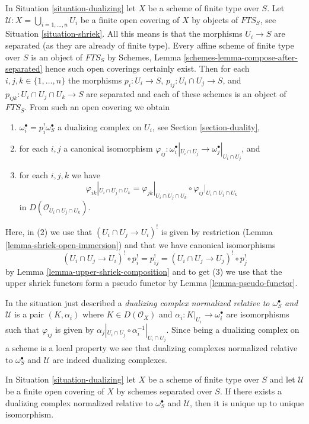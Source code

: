 \noindent
In Situation \ref{situation-dualizing} let $X$ be a scheme of finite type
over $S$. Let $\mathcal{U} : X = \bigcup_{i = 1, \ldots, n} U_i$
be a finite open covering of $X$ by objects of $\textit{FTS}_S$, see
Situation \ref{situation-shriek}. All this means is that the morphisms
$U_i \to S$ are separated (as they are already of finite type).
Every affine scheme of finite type over $S$ is an object of $\textit{FTS}_S$
by Schemes, Lemma \ref{schemes-lemma-compose-after-separated}
hence such open coverings certainly exist.
Then for each $i, j, k \in \{1, \ldots, n\}$
the morphisms $p_i : U_i \to S$, $p_{ij} : U_i \cap U_j \to S$,
and $p_{ijk} : U_i \cap U_j \cap U_k \to S$ are separated and
each of these schemes is an object of $\textit{FTS}_S$.
From such an open covering we obtain
\begin{enumerate}
\item $\omega_i^\bullet = p_i^!\omega_S^\bullet$
a dualizing complex on $U_i$, see Section \ref{section-duality},
\item for each $i, j$ a canonical isomorphism
$\varphi_{ij} :
\omega_i^\bullet|_{U_i \cap U_j} \to \omega_j^\bullet|_{U_i \cap U_j}$, and
\item
\label{item-cocycle-glueing}
for each $i, j, k$ we have
$$
\varphi_{ik}|_{U_i \cap U_j \cap U_k} =
\varphi_{jk}|_{U_i \cap U_j \cap U_k} \circ
\varphi_{ij}|_{U_i \cap U_j \cap U_k}
$$
in $D(\mathcal{O}_{U_i \cap U_j \cap U_k})$.
\end{enumerate}
Here, in (2) we use that $(U_i \cap U_j \to U_i)^!$
is given by restriction (Lemma \ref{lemma-shriek-open-immersion})
and that we have canonical isomorphisms
$$
(U_i \cap U_j \to U_i)^! \circ p_i^! = p_{ij}^! =
(U_i \cap U_j \to U_j)^! \circ p_j^!
$$
by Lemma \ref{lemma-upper-shriek-composition} and to get (3) we use
that the upper shriek functors form a pseudo functor by
Lemma \ref{lemma-pseudo-functor}.

\medskip\noindent
In the situation just described a
{\it dualizing complex normalized relative to $\omega_S^\bullet$
and $\mathcal{U}$} is a pair $(K, \alpha_i)$ where $K \in D(\mathcal{O}_X)$
and $\alpha_i : K|_{U_i} \to \omega_i^\bullet$ are isomorphisms
such that $\varphi_{ij}$ is given by
$\alpha_j|_{U_i \cap U_j} \circ \alpha_i^{-1}|_{U_i \cap U_j}$.
Since being a dualizing complex on a scheme is a local property
we see that dualizing complexes normalized relative to $\omega_S^\bullet$
and $\mathcal{U}$ are indeed dualizing complexes.

\begin{lemma}
\label{lemma-good-dualizing-unique}
In Situation \ref{situation-dualizing} let $X$ be a scheme of finite type
over $S$ and let $\mathcal{U}$ be a finite open covering of $X$
by schemes separated over $S$. If there exists a dualizing complex
normalized relative to $\omega_S^\bullet$ and $\mathcal{U}$, then it is unique
up to unique isomorphism.
\end{lemma}

